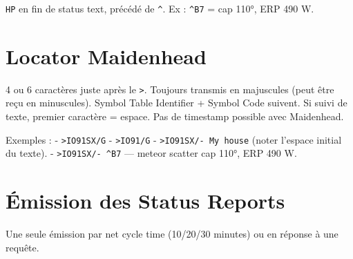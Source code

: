 \texttt{HP} en fin de status text, précédé de \texttt{\^{}}. Ex :
\texttt{\^{}B7} = cap 110°, ERP 490 W.

\section{Locator Maidenhead}\label{locator-maidenhead}

4 ou 6 caractères juste après le \texttt{\textgreater{}}. Toujours
transmis en majuscules (peut être reçu en minuscules). Symbol Table
Identifier + Symbol Code suivent. Si suivi de texte, premier caractère =
espace. Pas de timestamp possible avec Maidenhead.

Exemples : - \texttt{\textgreater{}IO91SX/G} -
\texttt{\textgreater{}IO91/G} -
\texttt{\textgreater{}IO91SX/-\ My\ house} (noter l'espace initial du
texte). - \texttt{\textgreater{}IO91SX/-\ \^{}B7} --- meteor scatter cap
110°, ERP 490 W.

\section{Émission des Status
Reports}\label{uxe9mission-des-status-reports}

Une seule émission par net cycle time (10/20/30 minutes) ou en réponse à
une requête.

